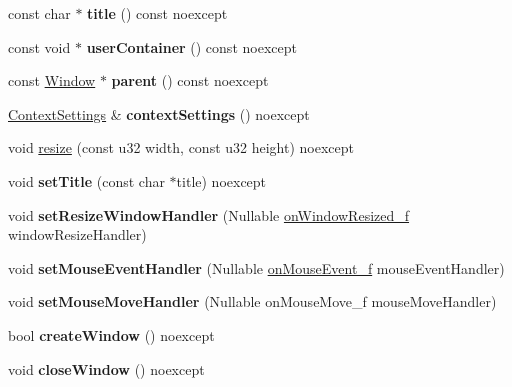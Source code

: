 \begin{DoxyCompactItemize}
const char $\ast$ {\bfseries title} () const noexcept
\item 
\mbox{\label{class_window_a6f48fd801b74b3894d6aef42dd65c24b}} 
const void $\ast$ {\bfseries user\+Container} () const noexcept
\item 
\mbox{\label{class_window_a3e379ed7a8891981f98d1cd46ec21e01}} 
const \mbox{\hyperlink{class_window}{Window}} $\ast$ {\bfseries parent} () const noexcept
\item 
\mbox{\label{class_window_a38fb1fd2a5a195451684f9570b31ca2b}} 
\mbox{\hyperlink{struct_context_settings}{Context\+Settings}} \& {\bfseries context\+Settings} () noexcept
\item 
void \mbox{\hyperlink{class_window_ad465b342c02505c01f38afa99d7fcbfe}{resize}} (const u32 width, const u32 height) noexcept
\item 
\mbox{\label{class_window_a1d3b5b6ac567d76dddab35bcf318890f}} 
void {\bfseries set\+Title} (const char $\ast$title) noexcept
\item 
\mbox{\label{class_window_a984c0f60001d7c45a6410d0c939120c9}} 
void {\bfseries set\+Resize\+Window\+Handler} (Nullable \mbox{\hyperlink{_window_8hpp_ada6d9541330d61d26fa6ba699a2d27ca}{on\+Window\+Resized\+\_\+f}} window\+Resize\+Handler)
\item 
\mbox{\label{class_window_a942f8a92e2c3d8c45f9382162b67898b}} 
void {\bfseries set\+Mouse\+Event\+Handler} (Nullable \mbox{\hyperlink{_window_8hpp_ab1aedf6a053ebea9af5d50b0888dcedd}{on\+Mouse\+Event\+\_\+f}} mouse\+Event\+Handler)
\item 
\mbox{\label{class_window_a1a7f5685815a9784844cf4bf00c84445}} 
void {\bfseries set\+Mouse\+Move\+Handler} (Nullable on\+Mouse\+Move\+\_\+f mouse\+Move\+Handler)
\item 
\mbox{\label{class_window_a81dbff4890442cf1dae94ab22456a716}} 
bool {\bfseries create\+Window} () noexcept
\item 
\mbox{\label{class_window_af146894ca4abaf77d748224ca3765270}} 
void {\bfseries close\+Window} () noexcept

\end{DoxyCompactItemize}
